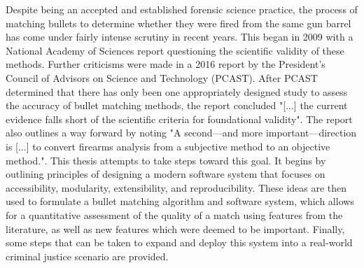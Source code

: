 
Despite being an accepted and established forensic science practice, the process of matching bullets to determine whether they were fired from the same gun barrel has come under fairly intense scrutiny in recent years. This began in 2009 with a National Academy of Sciences report questioning the scientific validity of these methods. Further criticisms were made in a 2016 report by the President's Council of Advisors on Science and Technology (PCAST). After PCAST determined that there has only been one appropriately designed study to assess the accuracy of bullet matching methods, the report concluded "[...] the current evidence falls short of the scientific criteria for foundational validity". The report also outlines a way forward by noting "A second—and more important—direction is [...] to convert firearms analysis from a subjective method to an objective method.". This thesis attempts to take steps toward this goal. It begins by outlining principles of designing a modern software system that focuses on accessibility, modularity, extensibility, and reproducibility. These ideas are then used to formulate a bullet matching algorithm and software system, which allows for a quantitative assessment of the quality of a match using features from the literature, as well as new features which were deemed to be important. Finally, some steps that can be taken to expand and deploy this system into a real-world criminal justice scenario are provided.
